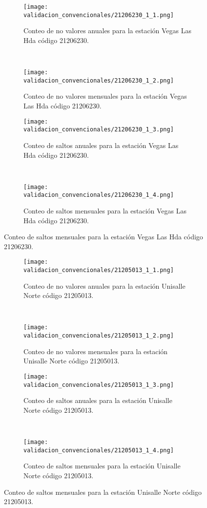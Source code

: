 \begin{figure}
    
    
    	\begin{subfigure}[normla]{0.4\textwidth}
	\texttt{[image: validacion\_convencionales/21206230\_1\_1.png]}
		\caption{Conteo de no valores anuales para la estación Vegas Las Hda código 21206230.}
		\label{subfig:a1}
		\end{subfigure}
		~
    \begin{subfigure}[normla]{0.4\textwidth}
	\texttt{[image: validacion\_convencionales/21206230\_1\_2.png]}
		\caption{Conteo de no valores mensuales para la estación Vegas Las Hda código 21206230.}
		\label{subfig:a2}
		\end{subfigure}
		
    \begin{subfigure}[normla]{0.4\textwidth}
	\texttt{[image: validacion\_convencionales/21206230\_1\_3.png]}
		\caption{Conteo de saltos anuales para la estación Vegas Las Hda código 21206230.}
		\label{subfig:a1}
		\end{subfigure}
		~
    \begin{subfigure}[normla]{0.4\textwidth}
	\texttt{[image: validacion\_convencionales/21206230\_1\_4.png]}
		\caption{Conteo de saltos mensuales para la estación Vegas Las Hda código 21206230.}
		\label{subfig:a2}
		\end{subfigure}

	
\end{figure}
           
\begin{figure}[H]\ContinuedFloat
\centering
	\begin{subfigure}[normla]{0.4\textwidth}
	\texttt{[image: validacion\_convencionales/21205013\_1\_1.png]}
		\caption{Conteo de no valores anuales para la estación Unisalle Norte código 21205013.}
		\label{subfig:a1}
		\end{subfigure}
		~
    \begin{subfigure}[normla]{0.4\textwidth}
	\texttt{[image: validacion\_convencionales/21205013\_1\_2.png]}
		\caption{Conteo de no valores mensuales para la estación Unisalle Norte código 21205013.}
		\label{subfig:a2}
		\end{subfigure}
		
    \begin{subfigure}[normla]{0.4\textwidth}
	\texttt{[image: validacion\_convencionales/21205013\_1\_3.png]}
		\caption{Conteo de saltos anuales para la estación Unisalle Norte código 21205013.}
		\label{subfig:a1}
		\end{subfigure}
		~
    \begin{subfigure}[normla]{0.4\textwidth}
	\texttt{[image: validacion\_convencionales/21205013\_1\_4.png]}
		\caption{Conteo de saltos mensuales para la estación Unisalle Norte código 21205013.}
		\label{subfig:a2}
		\end{subfigure}

	
\end{figure}
           
